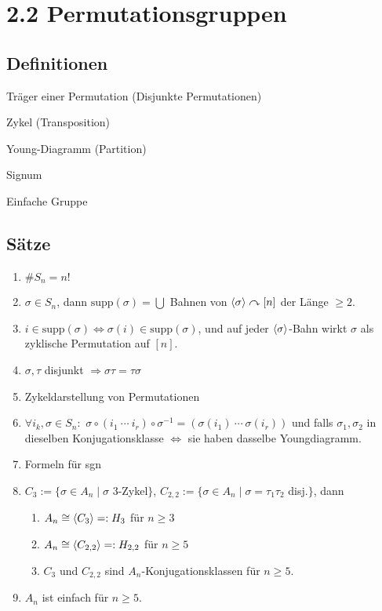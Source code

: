 \documentclass[twocolumn]{report}
\begin{document}
\section*{2.2 Permutationsgruppen}
\subsection*{Definitionen}
\begin{enumerate*}[label=2.\arabic*, itemsep=0pt, topsep=0pt, parsep=0pt, partopsep=0pt, leftmargin=*]
    \item Träger einer Permutation (Disjunkte Permutationen)
    \item Zykel (Transposition)
    \item Young-Diagramm (Partition)
    \item Signum
    \item Einfache Gruppe
\end{enumerate*}

\subsection*{Sätze}
\begin{enumerate}[label=2.\arabic*, itemsep=0pt, topsep=0pt, parsep=0pt, partopsep=0pt, leftmargin=*]
    \item $\# S_n = n!$
    \item $\sigma \in S_n$, dann $\text{supp}(\sigma) = \bigcup$ Bahnen von $\langle \sigma\rangle \curvearrowright [n]$ der Länge $\ge 2$.
    \item $i \in \text{supp}(\sigma) \iff \sigma(i) \in \text{supp}(\sigma)$, und auf jeder $\langle\sigma\rangle$-Bahn wirkt $\sigma$ als zyklische Permutation auf $[n]$.
    \item $\sigma, \tau$ disjunkt $\Rightarrow \sigma \tau = \tau \sigma$
    \item Zykeldarstellung von Permutationen
    \item $\forall i_k, \sigma \in S_n:$ $\sigma \circ (i_1 \ \cdots \ i_r) \circ \sigma^{-1} = (\sigma(i_1)\ \cdots \ \sigma(i_r))$ und falls $\sigma_1, \sigma_2$ in dieselben Konjugationsklasse $\iff$ sie haben dasselbe Youngdiagramm.
    \item Formeln für sgn
    \item $C_3:= \{\sigma \in A_n \mid \sigma$ 3-Zykel$\}$, $C_{2,2}:=\{\sigma \in A_n \mid \sigma = \tau_1 \tau_2$ disj.$\}$, dann
    \begin{enumerate}[label=(\arabic*), itemsep=0pt, topsep=0pt, parsep=0pt, partopsep=0pt, leftmargin=*]
        \item $A_n \cong \langle C_3\rangle =: H_3$ für $n \ge 3$
        \item $A_n \cong \langle C_{2,2}\rangle =: H_{2,2}$ für $n \ge 5$
        \item $C_3$ und $C_{2,2}$ sind $A_n$-Konjugationsklassen für $n \ge 5$.
    \end{enumerate}
    \item $A_n$ ist einfach für $n \ge 5$.
\end{enumerate}
\end{document}
